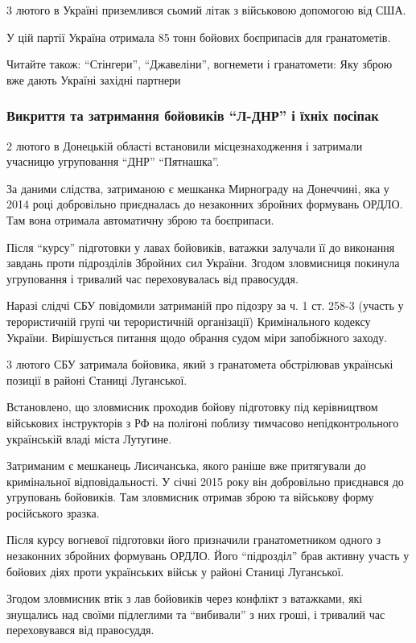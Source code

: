 3 лютого в Україні приземлився сьомий літак з військовою допомогою від США.

У цій партії Україна отримала 85 тонн бойових боєприпасів для гранатометів.

Читайте також: \enquote{Стінгери}, \enquote{Джавеліни}, вогнемети і
гранатомети: Яку зброю вже дають Україні західні партнери

\subsubsection{Викриття та затримання бойовиків \enquote{Л-ДНР} і їхніх
посіпак}

2 лютого в Донецькій області встановили місцезнаходження і затримали учасницю
угруповання \enquote{ДНР} \enquote{Пятнашка}.

За даними слідства, затриманою є мешканка Мирнограду на Донеччині, яка у 2014
році добровільно приєдналась до незаконних збройних формувань ОРДЛО. Там вона
отримала автоматичну зброю та боєприпаси.

Після \enquote{курсу} підготовки у лавах бойовиків, ватажки залучали її до
виконання завдань проти підрозділів Збройних сил України. Згодом зловмисниця
покинула угруповання і тривалий час переховувалась від правосуддя.

Наразі слідчі СБУ повідомили затриманій про підозру за ч. 1 ст. 258-3 (участь у
терористичній групі чи терористичній організації) Кримінального кодексу
України. Вирішується питання щодо обрання судом міри запобіжного заходу.

3 лютого СБУ затримала бойовика, який з гранатомета обстрілював українські
позиції в районі Станиці Луганської.

Встановлено, що зловмисник проходив бойову підготовку під керівництвом
військових інструкторів з РФ на полігоні поблизу тимчасово непідконтрольного
українській владі міста Лутугине.

Затриманим є мешканець Лисичанська, якого раніше вже притягували до
кримінальної відповідальності. У січні 2015 року він добровільно приєднався до
угруповань бойовиків. Там зловмисник отримав зброю та військову форму
російського зразка.

Після курсу вогневої підготовки його призначили гранатометником одного з
незаконних збройних формувань ОРДЛО. Його \enquote{підрозділ} брав активну участь у
бойових діях проти українських військ у районі Станиці Луганської.

Згодом зловмисник втік з лав бойовиків через конфлікт з ватажками, які
знущались над своїми підлеглими та \enquote{вибивали} з них гроші, і тривалий час
переховувався від правосуддя.

